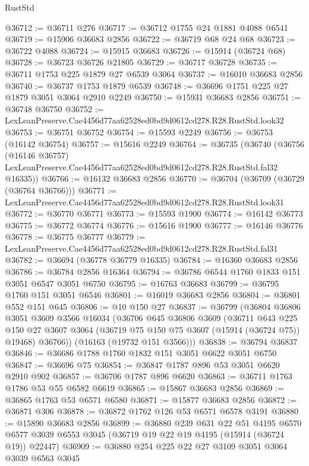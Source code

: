 \begin{lexlean}{RustStd}
\begin{coremodule}
@36712 := @36711 @276
@36717 := @36712 @1755 @24 @1881 @4088 @6541
@36719 := @15906 @36683 @2856
@36722 := @36719 @68 @24 @68
@36723 := @36722 @4088
@36724 := @15915 @36683
@36726 := @15914 (@36724 @68)
@36728 := @36723 @36726 @21805
@36729 := @36717 @36728
@36735 := @36711 @1753 @225 @1879 @27 @6539 @3064
@36737 := @16010 @36683 @2856
@36740 := @36737 @1753 @1879 @6539
@36748 := @36696 @1751 @225 @27 @1879 @3051 @3064 @2910 @2249
@36750 := @15931 @36683 @2856
@36751 := @36748 @36750
@36752 := LexLeanPreserve.Cae4456d77aa62528ed0bd9d0612cd278.R28.RustStd.look32
@36753 := @36751 @36752
@36754 := @15593 @2249
@36756 := @36753 (@16142 @36754)
@36757 := @15616 @2249
@36764 := @36735
    (@36740
      (@36756
        (@16146 @36757)
        LexLeanPreserve.Cae4456d77aa62528ed0bd9d0612cd278.R28.RustStd.fal32
        @16335))
@36766 := @16132 @36683 @2856
@36770 := @36704 (@36709 (@36729 (@36764 @36766)))
@36771 := LexLeanPreserve.Cae4456d77aa62528ed0bd9d0612cd278.R28.RustStd.look31
@36772 := @36770 @36771
@36773 := @15593 @1900
@36774 := @16142 @36773
@36775 := @36772 @36774
@36776 := @15616 @1900
@36777 := @16146 @36776
@36778 := @36775 @36777
@36779 := LexLeanPreserve.Cae4456d77aa62528ed0bd9d0612cd278.R28.RustStd.fal31
@36782 := @36694 (@36778 @36779 @16335)
@36784 := @16360 @36683 @2856
@36786 := @36784 @2856 @16364
@36794 := @36786 @6544 @1760 @1833 @151 @3051 @6547 @3051 @6750
@36795 := @16763 @36683
@36799 := @36795 @1760 @151 @3051 @6546
@36801 := @16019 @36683 @2856
@36804 := @36801 @552 @151 @645
@36806 := @10 @150 @27
@36837 := @36799
    (@36804
      @36806
      @3051
      @3609
      @3566
      @16034
      (@36706
        @645
        @36806
        @3609
        (@36711
          @643
          @225
          @150
          @27
          @3607
          @3064
          (@36719 @75 @150 @75 @3607 (@15914 (@36724 @75)) @19468)
          @36766))
      (@16163 (@19732 @151 @3566)))
@36838 := @36794 @36837
@36846 := @36686 @1788 @1760 @1832 @151 @3051 @6622 @3051 @6750
@36847 := @36696 @75
@36854 := @36847 @1787 @896 @53 @3051 @6620 @2910 @902
@36857 := @36706 @1787 @896 @6620
@36863 := @36711 @1763 @1786 @53 @55 @6582 @6619
@36865 := @15867 @36683 @2856
@36869 := @36865 @1763 @53 @6571 @6580
@36871 := @15877 @36683 @2856
@36872 := @36871 @306
@36878 := @36872 @1762 @126 @53 @6571 @6578 @3191
@36880 := @15890 @36683 @2856
@36899 := @36880
    @239
    @631
    @22
    @51
    @4195
    @6570
    @6577
    @3039
    @6553
    @3045
    (@36719 @19 @22 @19 @4195 (@15914 (@36724 @19)) @22447)
@36909 := @36880 @254 @225 @22 @27 @3109 @3051 @3064 @3039 @6563 @3045

\end{coremodule}
\end{lexlean}
